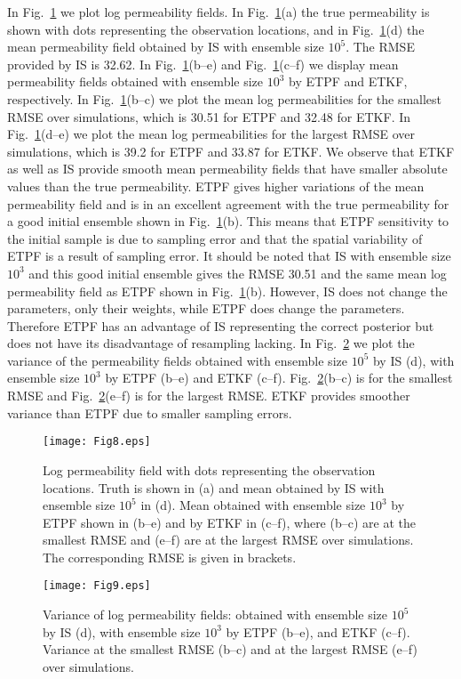 \documentclass[12, a4paper]{article}
\numberwithin{equation}{section}
\begin{document}
In Fig.~\ref{Fig_HDMF} we plot log permeability fields. In Fig.~\ref{Fig_HDMF}(a) the true permeability is shown with dots representing the observation locations, and in Fig.~\ref{Fig_HDMF}(d) the mean permeability field obtained by IS with ensemble size $10^5$. The RMSE provided by IS is 32.62.
In Fig.~\ref{Fig_HDMF}(b--e) and Fig.~\ref{Fig_HDMF}(c--f) we display mean permeability fields obtained with ensemble size $10^3$ by ETPF and ETKF, respectively. In Fig.~\ref{Fig_HDMF}(b--c) we plot the mean log permeabilities for the smallest RMSE over simulations, which is 30.51 for ETPF and 32.48 for ETKF.
In Fig.~\ref{Fig_HDMF}(d--e) we plot the mean log permeabilities for the largest RMSE over simulations, which is 39.2 for ETPF and 33.87 for ETKF. 
We observe that ETKF as well as IS provide smooth mean permeability fields that have smaller absolute values than the true permeability. ETPF gives higher variations of the mean permeability field and is in an excellent agreement with the true permeability for a good initial ensemble shown in Fig.~\ref{Fig_HDMF}(b). 
This means that ETPF sensitivity to the initial sample is due to sampling error and that the spatial variability of ETPF is a result of  sampling error.
It should be noted that IS with ensemble size $10^3$ and this good initial ensemble gives the RMSE 30.51 and the same mean log permeability field as ETPF shown in Fig.~\ref{Fig_HDMF}(b). However, IS does not change the parameters, only their weights, while ETPF does change the parameters. Therefore ETPF has an advantage of IS representing the correct posterior but does not have its disadvantage of resampling lacking.
In Fig.~\ref{Fig_HDVF} we plot the variance of the permeability fields obtained with ensemble size $10^5$ by IS (d), with ensemble size $10^3$ by ETPF (b--e) and ETKF (c--f). Fig.~\ref{Fig_HDVF}(b--c) is for the smallest RMSE and Fig.~\ref{Fig_HDVF}(e--f) is for the largest RMSE. 
ETKF provides smoother variance than ETPF due to smaller sampling errors. 
\begin{figure} [t]
	\centering		
	\texttt{[image: Fig8.eps]}	
	\caption{Log permeability field with dots representing the observation locations. Truth is shown in (a) and mean obtained by IS with ensemble size $10^5$ in (d).
		Mean obtained with ensemble size $10^3$ by ETPF shown in (b--e) and by ETKF in (c--f),
		where (b--c) are at the smallest RMSE and (e--f) are at the largest RMSE over simulations. The corresponding RMSE is given in brackets.}
	\label{Fig_HDMF}
\end{figure}  
\begin{figure} [t]
	\centering		
	\texttt{[image: Fig9.eps]}	
	\caption{Variance of log permeability fields: obtained with ensemble size $10^5$ by IS (d), with ensemble size $10^3$ by ETPF (b--e), and ETKF (c--f). Variance at the smallest RMSE (b--c) and at the largest RMSE (e--f) over simulations.}	
	\label{Fig_HDVF}
\end{figure}  
\end{document}
